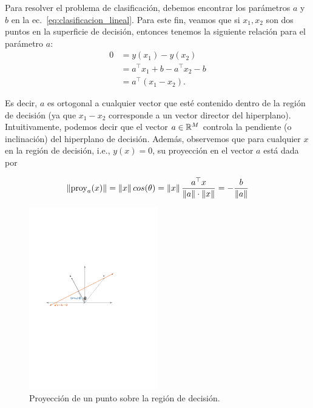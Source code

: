 \vspace{1cm}


Para resolver el problema de clasificación, debemos encontrar los parámetros $a$ y $b$ en la ec.~\eqref{eq:clasificacion_lineal}. Para este fin, veamos que si $x_1,x_2$ son dos puntos en la superficie de decisión, entonces tenemos la siguiente relación para el parámetro $a$:
\begin{align}
	0 &= y(x_1) - y(x_2) \nonumber\\
	  &= a^\top x_1 + b - a^\top x_2 - b \nonumber\\
	  &= a^\top (x_1-x_2).
\end{align}

Es decir, $a$ es ortogonal a cualquier vector que esté contenido dentro de la región de decisión (ya que $x_1-x_2$ corresponde a un vector director del hiperplano). Intuitivamente, podemos decir que el vector $a\in\mathbb{R}^M$ controla la pendiente (o inclinación) del hiperplano de decisión. Además, observemos que para cualquier $x$ en la región de decisión, i.e., $y(x)=0$,  su proyección en el vector $a$ está dada por 
	
	\begin{equation}
	\left\lVert\text{proy}_a(x)\right\rVert = \left\lVert x\right\rVert cos(\theta) = \left\lVert x\right\rVert \frac{a^\top x}{\left\lVert a\right\rVert\cdot\left\lVert x\right\rVert} = -\frac{b}{\left\lVert a\right\rVert}
\end{equation}


\begin{figure}[h]
    \centering
    \includegraphics[width=0.5\textwidth]{img/cap3_proy.pdf}
    \caption{Proyección de un punto sobre la región de decisión. }
\end{figure}

